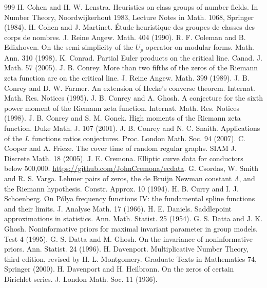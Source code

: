 \begin{thebibliography}{999}
 H. Cohen and H. W. Lenstra. Heuristics on class groups of number fields. In Number Theory, Noordwijkerhout 1983, Lecture Notes in Math. 1068, Springer (1984).
 H. Cohen and J. Martinet. \'Etude heuristique des groupes de classes des corps de nombres. J. Reine Angew. Math. 404 (1990).
 R. F. Coleman and B. Edixhoven. On the semi simplicity of the $U_p$ operator on modular forms. Math. Ann. 310 (1998).
 K. Conrad. Partial Euler products on the critical line. Canad. J. Math. 57 (2005).
 J. B. Conrey. More than two fifths of the zeros of the Riemann zeta function are on the critical line. J. Reine Angew. Math. 399 (1989).
 J. B. Conrey and D. W. Farmer. An extension of Hecke's converse theorem. Internat. Math. Res. Notices (1995).
 J. B. Conrey and A. Ghosh. A conjecture for the sixth power moment of the Riemann zeta function. Internat. Math. Res. Notices (1998).
 J. B. Conrey and S. M. Gonek. High moments of the Riemann zeta function. Duke Math. J. 107 (2001).
 J. B. Conrey and N. C. Snaith. Applications of the $L$ functions ratios conjectures. Proc. London Math. Soc. 94 (2007).
 C. Cooper and A. Frieze. The cover time of random regular graphs. SIAM J. Discrete Math. 18 (2005).
 J. E. Cremona. Elliptic curve data for conductors below 500{,}000. \url{https://github.com/JohnCremona/ecdata}.
 G. Csordas, W. Smith and R. S. Varga. Lehmer pairs of zeros, the de Bruijn Newman constant $\Lambda$, and the Riemann hypothesis. Constr. Approx. 10 (1994).
 H. B. Curry and I. J. Schoenberg. On P\'olya frequency functions IV: the fundamental spline functions and their limits. J. Analyse Math. 17 (1966).
 H. E. Daniels. Saddlepoint approximations in statistics. Ann. Math. Statist. 25 (1954).
 G. S. Datta and J. K. Ghosh. Noninformative priors for maximal invariant parameter in group models. Test 4 (1995).
 G. S. Datta and M. Ghosh. On the invariance of noninformative priors. Ann. Statist. 24 (1996).
 H. Davenport. Multiplicative Number Theory, third edition, revised by H. L. Montgomery. Graduate Texts in Mathematics 74, Springer (2000).
 H. Davenport and H. Heilbronn. On the zeros of certain Dirichlet series. J. London Math. Soc. 11 (1936).

\end{thebibliography}
